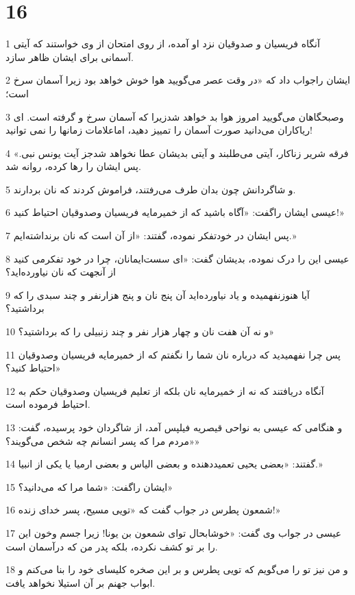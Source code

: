 \chapter{16}

\par 1 آنگاه فریسیان و صدوقیان نزد او آمده، از روی امتحان از وی خواستند که آیتی آسمانی برای ایشان ظاهر سازد.
\par 2 ایشان راجواب داد که «در وقت عصر می‌گویید هوا خوش خواهد بود زیرا آسمان سرخ است؛
\par 3 وصبحگاهان می‌گویید امروز هوا بد خواهد شدزیرا که آسمان سرخ و گرفته است. ای ریاکاران می‌دانید صورت آسمان را تمییز دهید، اماعلامات زمانها را نمی توانید!
\par 4 فرقه شریر زناکار، آیتی می‌طلبند و آیتی بدیشان عطا نخواهد شدجز آیت یونس نبی.» پس ایشان را رها کرده، روانه شد.
\par 5 و شاگردانش چون بدان طرف می‌رفتند، فراموش کردند که نان بردارند.
\par 6 عیسی ایشان راگفت: «آگاه باشید که از خمیرمایه فریسیان وصدوقیان احتیاط کنید!»
\par 7 پس ایشان در خودتفکر نموده، گفتند: «از آن است که نان برنداشته‌ایم.»
\par 8 عیسی این را درک نموده، بدیشان گفت: «ای سست‌ایمانان، چرا در خود تفکرمی کنید از آنجهت که نان نیاورده‌اید؟
\par 9 آیا هنوزنفهمیده و یاد نیاورده‌اید آن پنج نان و پنج هزارنفر و چند سبدی را که برداشتید؟
\par 10 و نه آن هفت نان و چهار هزار نفر و چند زنبیلی را که برداشتید؟»
\par 11 پس چرا نفهمیدید که درباره نان شما را نگفتم که از خمیرمایه فریسیان وصدوقیان احتیاط کنید؟»
\par 12 آنگاه دریافتند که نه از خمیرمایه نان بلکه از تعلیم فریسیان وصدوقیان حکم به احتیاط فرموده است.
\par 13 و هنگامی که عیسی به نواحی قیصریه فیلپس آمد، از شاگردان خود پرسیده، گفت: «مردم مرا که پسر انسانم چه شخص می‌گویند؟»
\par 14 گفتند: «بعضی یحیی تعمید‌دهنده و بعضی الیاس و بعضی ارمیا یا یکی از انبیا.»
\par 15 ایشان راگفت: «شما مرا که می‌دانید؟»
\par 16 شمعون پطرس در جواب گفت که «تویی مسیح، پسر خدای زنده!»
\par 17 عیسی در جواب وی گفت: «خوشابحال تو‌ای شمعون بن یونا! زیرا جسم وخون این را بر تو کشف نکرده، بلکه پدر من که درآسمان است.
\par 18 و من نیز تو را می‌گویم که تویی پطرس و بر این صخره کلیسای خود را بنا می‌کنم و ابواب جهنم بر آن استیلا نخواهد یافت.
